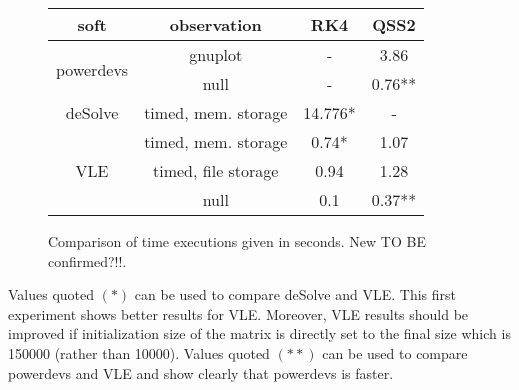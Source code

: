 \documentclass{article}
\theoremstyle{remark}
\begin{document}
\begin{figure}
\begin{center}
\begin{tabular}{|c|c|c|c|}
\hline
soft                      & observation         & RK4     & QSS2  \\\hline\hline
\multirow{2}{*}{powerdevs}& gnuplot             &  -      & 3.86  \\ \cline{2-4}
                          & null                &  -      & 0.76**  \\ \hline
deSolve                   & timed, mem. storage &  14.776* & -     \\ \hline
\multirow{3}{*}{VLE}      & timed, mem. storage &  0.74*  & 1.07\\\cline{2-4} 
                          & timed, file storage &  0.94  & 1.28 \\ \cline{2-4}
                          & null                &  0.1  & 0.37** \\ \hline
\end{tabular}
\caption{Comparison of time executions given in seconds. New TO BE
confirmed?!!.}
\end{center}
\end{figure}

Values quoted $(*)$ can be used to compare deSolve and VLE. This first
experiment shows better results for VLE. Moreover, VLE results should be 
improved if initialization size of the matrix is directly set to the final size
which is 150000 (rather than 10000). Values quoted $(**)$ can be used to compare
powerdevs and VLE and show clearly that powerdevs is faster.  



% 
% 
% 
%   
% 	
% 
% 		 
%   
\end{document}

